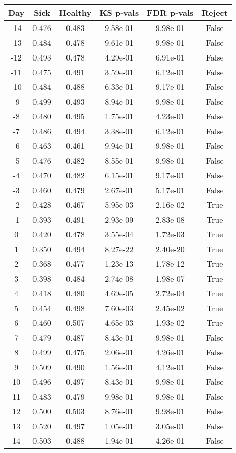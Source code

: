 \begin{tabular}{c|c|c|c|c|c}
Day &  Sick & Healthy &  KS p-vals & FDR p-vals & Reject\\
\hline
-14 & 0.476 &   0.483 &   9.58e-01 &   9.98e-01 &  False\\
-13 & 0.484 &   0.478 &   9.61e-01 &   9.98e-01 &  False\\
-12 & 0.493 &   0.478 &   4.29e-01 &   6.91e-01 &  False\\
-11 & 0.475 &   0.491 &   3.59e-01 &   6.12e-01 &  False\\
-10 & 0.484 &   0.488 &   6.33e-01 &   9.17e-01 &  False\\
 -9 & 0.499 &   0.493 &   8.94e-01 &   9.98e-01 &  False\\
 -8 & 0.480 &   0.495 &   1.75e-01 &   4.23e-01 &  False\\
 -7 & 0.486 &   0.494 &   3.38e-01 &   6.12e-01 &  False\\
 -6 & 0.463 &   0.461 &   9.94e-01 &   9.98e-01 &  False\\
 -5 & 0.476 &   0.482 &   8.55e-01 &   9.98e-01 &  False\\
 -4 & 0.470 &   0.482 &   6.15e-01 &   9.17e-01 &  False\\
 -3 & 0.460 &   0.479 &   2.67e-01 &   5.17e-01 &  False\\
 -2 & 0.428 &   0.467 &   5.95e-03 &   2.16e-02 &   True\\
 -1 & 0.393 &   0.491 &   2.93e-09 &   2.83e-08 &   True\\
  0 & 0.420 &   0.478 &   3.55e-04 &   1.72e-03 &   True\\
  1 & 0.350 &   0.494 &   8.27e-22 &   2.40e-20 &   True\\
  2 & 0.368 &   0.477 &   1.23e-13 &   1.78e-12 &   True\\
  3 & 0.398 &   0.484 &   2.74e-08 &   1.98e-07 &   True\\
  4 & 0.418 &   0.480 &   4.69e-05 &   2.72e-04 &   True\\
  5 & 0.454 &   0.498 &   7.60e-03 &   2.45e-02 &   True\\
  6 & 0.460 &   0.507 &   4.65e-03 &   1.93e-02 &   True\\
  7 & 0.479 &   0.487 &   8.43e-01 &   9.98e-01 &  False\\
  8 & 0.499 &   0.475 &   2.06e-01 &   4.26e-01 &  False\\
  9 & 0.509 &   0.490 &   1.56e-01 &   4.12e-01 &  False\\
 10 & 0.496 &   0.497 &   8.43e-01 &   9.98e-01 &  False\\
 11 & 0.483 &   0.479 &   9.98e-01 &   9.98e-01 &  False\\
 12 & 0.500 &   0.503 &   8.76e-01 &   9.98e-01 &  False\\
 13 & 0.520 &   0.497 &   1.05e-01 &   3.05e-01 &  False\\
 14 & 0.503 &   0.488 &   1.94e-01 &   4.26e-01 &  False\\
\end{tabular}